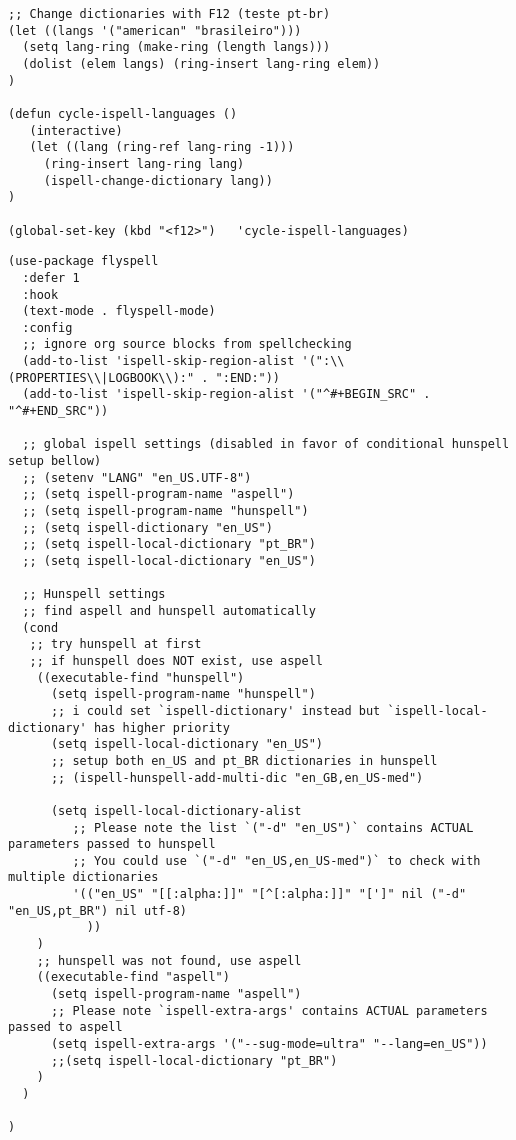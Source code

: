 \documentclass[11pt]{article}
\begin{document}
\begin{verbatim}
;; Change dictionaries with F12 (teste pt-br)
(let ((langs '("american" "brasileiro")))
  (setq lang-ring (make-ring (length langs)))
  (dolist (elem langs) (ring-insert lang-ring elem))
)

(defun cycle-ispell-languages ()
   (interactive)
   (let ((lang (ring-ref lang-ring -1)))
     (ring-insert lang-ring lang)
     (ispell-change-dictionary lang))
)

(global-set-key (kbd "<f12>")   'cycle-ispell-languages)
\end{verbatim}

\begin{verbatim}
(use-package flyspell
  :defer 1
  :hook
  (text-mode . flyspell-mode)
  :config
  ;; ignore org source blocks from spellchecking
  (add-to-list 'ispell-skip-region-alist '(":\\(PROPERTIES\\|LOGBOOK\\):" . ":END:"))
  (add-to-list 'ispell-skip-region-alist '("^#+BEGIN_SRC" . "^#+END_SRC"))

  ;; global ispell settings (disabled in favor of conditional hunspell setup bellow)
  ;; (setenv "LANG" "en_US.UTF-8")
  ;; (setq ispell-program-name "aspell")
  ;; (setq ispell-program-name "hunspell")
  ;; (setq ispell-dictionary "en_US")
  ;; (setq ispell-local-dictionary "pt_BR")
  ;; (setq ispell-local-dictionary "en_US")

  ;; Hunspell settings
  ;; find aspell and hunspell automatically
  (cond
   ;; try hunspell at first
   ;; if hunspell does NOT exist, use aspell
    ((executable-find "hunspell")
      (setq ispell-program-name "hunspell")
      ;; i could set `ispell-dictionary' instead but `ispell-local-dictionary' has higher priority
      (setq ispell-local-dictionary "en_US")
      ;; setup both en_US and pt_BR dictionaries in hunspell
      ;; (ispell-hunspell-add-multi-dic "en_GB,en_US-med")

      (setq ispell-local-dictionary-alist
         ;; Please note the list `("-d" "en_US")` contains ACTUAL parameters passed to hunspell
         ;; You could use `("-d" "en_US,en_US-med")` to check with multiple dictionaries
         '(("en_US" "[[:alpha:]]" "[^[:alpha:]]" "[']" nil ("-d" "en_US,pt_BR") nil utf-8)
           ))
    )
    ;; hunspell was not found, use aspell
    ((executable-find "aspell")
      (setq ispell-program-name "aspell")
      ;; Please note `ispell-extra-args' contains ACTUAL parameters passed to aspell
      (setq ispell-extra-args '("--sug-mode=ultra" "--lang=en_US"))
      ;;(setq ispell-local-dictionary "pt_BR")
    )
  )

)
\end{verbatim}
\end{document}
